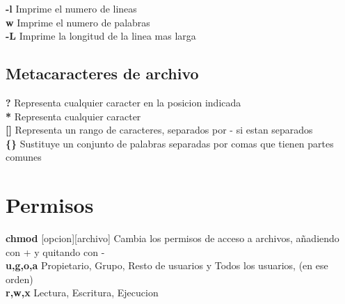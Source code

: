 \documentclass[11pt]{article}
\begin{document}
\hspace{2cm} \textbf{-l}
\hspace{2cm} Imprime el numero de lineas\\

\hspace{2cm} \textbf{w}
\hspace{2cm} Imprime el numero de palabras\\

\hspace{2cm} \textbf{-L}
\hspace{2cm} Imprime la longitud de la linea mas larga\\




\subsection {Metacaracteres de archivo}

\textbf{?} \hspace{2cm} Representa cualquier caracter en la posicion indicada\\

\textbf{*} \hspace{2cm} Representa cualquier caracter\\

\textbf{[]} \hspace{2cm} Representa un rango de caracteres, separados por - si estan separados\\

\textbf{\{\}} \hspace{2cm} Sustituye un conjunto de palabras separadas por comas que tienen partes comunes\\


\section{Permisos}
\textbf{chmod} [opcion][archivo] \hspace{2cm} Cambia los permisos de acceso a archivos, añadiendo con + y quitando con - \\

\hspace{2cm} \textbf{u,g,o,a} \hspace{2cm} Propietario, Grupo, Resto de usuarios y Todos los usuarios, (en ese orden)\\

\hspace{2cm} \textbf{r,w,x} \hspace{2cm} Lectura, Escritura, Ejecucion \\
\end{document}
